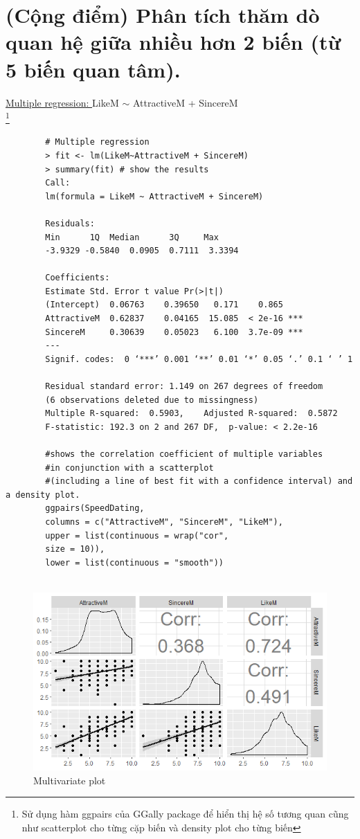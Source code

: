 \documentclass[a4paper,12pt]{article}
\begin{document}
	\section{(Cộng điểm) Phân tích thăm dò quan hệ giữa nhiều hơn 2 biến (từ 5 biến quan tâm).}
	\underline{Multiple regression: }LikeM $\sim$ AttractiveM + SincereM\\
	\footnote{Sử dụng hàm ggpairs của GGally package để hiển thị hệ số tương quan cũng như scatterplot cho từng cặp biến và density plot cho từng biến}
	\begin{lstlisting}
		# Multiple regression
		> fit <- lm(LikeM~AttractiveM + SincereM)
		> summary(fit) # show the results
		Call:
		lm(formula = LikeM ~ AttractiveM + SincereM)
		
		Residuals:
		Min      1Q  Median      3Q     Max 
		-3.9329 -0.5840  0.0905  0.7111  3.3394
		
		Coefficients:
		Estimate Std. Error t value Pr(>|t|)    
		(Intercept)  0.06763    0.39650   0.171    0.865    
		AttractiveM  0.62837    0.04165  15.085  < 2e-16 ***
		SincereM     0.30639    0.05023   6.100  3.7e-09 ***
		---
		Signif. codes:  0 ‘***’ 0.001 ‘**’ 0.01 ‘*’ 0.05 ‘.’ 0.1 ‘ ’ 1
		
		Residual standard error: 1.149 on 267 degrees of freedom
		(6 observations deleted due to missingness)
		Multiple R-squared:  0.5903,	Adjusted R-squared:  0.5872 
		F-statistic: 192.3 on 2 and 267 DF,  p-value: < 2.2e-16
		
		#shows the correlation coefficient of multiple variables 
		#in conjunction with a scatterplot 
		#(including a line of best fit with a confidence interval) and a density plot.
		ggpairs(SpeedDating, 
		columns = c("AttractiveM", "SincereM", "LikeM"), 
		upper = list(continuous = wrap("cor", 
		size = 10)), 
		lower = list(continuous = "smooth"))
		
	\end{lstlisting}
	
	\begin{figure}[H]
		\centering
		\includegraphics[width=1.0\linewidth]{Images/Rplot_3v}
		\caption{Multivariate plot}
		\label{fig:rplot3v}
	\end{figure}
	
\end{document}
